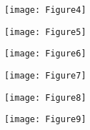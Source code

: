 \documentclass[10pt]{article}
\begin{document}
\newpage
\begin{figure}[!h]
\label{garcia}
\begin{center}
\texttt{[image: Figure4]}\\
\end{center}
\caption{}
\end{figure}

\newpage
\begin{figure}[!h]
\label{MGPU}
\begin{center}
\texttt{[image: Figure5]}
\end{center}
\caption{}
\end{figure}

\newpage
\begin{figure}[!h]
\label{MGPU}
\begin{center}
\texttt{[image: Figure6]}
\end{center}
\caption{}
\end{figure}

\newpage
\begin{figure}[!h]
\label{MGPU}
\begin{center}
\texttt{[image: Figure7]}
\end{center}
\caption{}
\end{figure}

\newpage
\begin{figure}[!h]
\label{MGPU}
\begin{center}
\texttt{[image: Figure8]}
\end{center}
\caption{}
\end{figure}

\newpage
\begin{figure}[!h]
\label{MGPU}
\begin{center}
\texttt{[image: Figure9]}
\end{center}
\caption{}
\end{figure}


 




 
\end{document}
